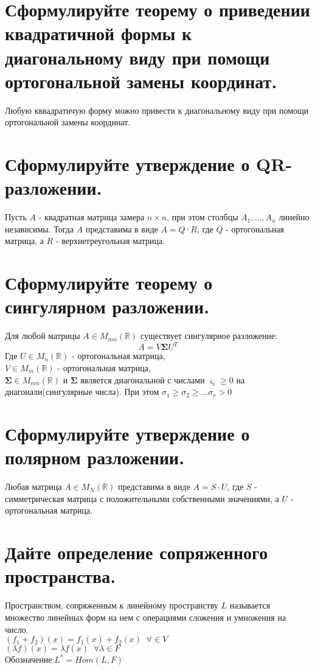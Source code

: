 \documentclass{article}
\newcommand{\R}[0]{
    \mathbb{R}
}
\begin{document}
\section{Сформулируйте теорему о приведении квадратичной формы к диагональному виду при помощи ортогональной замены координат.}
Любую кввадратичую форму можно привести к диагональному виду при помощи ортогональной замены координат.

\section{Сформулируйте утверждение о QR-разложении.}
Пусть $A$ - квадратная матрица замера $n \times n$,
при этом столбцы $A_1, \ldots , A_n$ линейно независимы.
Тогда $A$ представима в виде $A = Q \cdot R$, где $Q$ - ортогональная
матрица, а $R$ - верхнетреугольная матрица.

\section{Сформулируйте теорему о сингулярном разложении.}
Для любой матрицы $A \in M_{mn}(\R)$ существует сингулярное разложение:
$$
A = V \mathbf{\Sigma} U^T
$$
Где $U \in M_n(\R)$ - ортогональная матрица,\\
$V \in M_m(\R)$ - ортогональная матрица,\\
$\mathbf{\Sigma} \in M_{mn}(\R)$ и $\mathbf{\Sigma}$ является
диагональной с числами $\varsigma_i \geq 0$ на диагонали(сингулярные числа).
При этом $\sigma_1 \geq \sigma_2 \geq \ldots \sigma_r > 0$

\section{Сформулируйте утверждение о полярном разложении.}
Любая матрица $A\in M_N(\R)$ представима в виде
$A = S \cdot U$, где $S$ - симметрическая матрица с положительными собственными
значениями, а $U$ - ортогональная матрица.

\section{Дайте определение сопряженного пространства.}
Пространством, сопряженным к линейному пространству $L$
называется множество линейных форм на нем с операциями
сложения и умножения на число.
\\
$(f_1 + f_2)(x) = f_1(x) + f_2(x) \;\; \forall  \in V$
\\
$(\lambda f)(x) =  \lambda f(x) \;\; \forall \lambda \in F$
\\
Обозначение:$L^* = Hom(L, F)$
\end{document}
